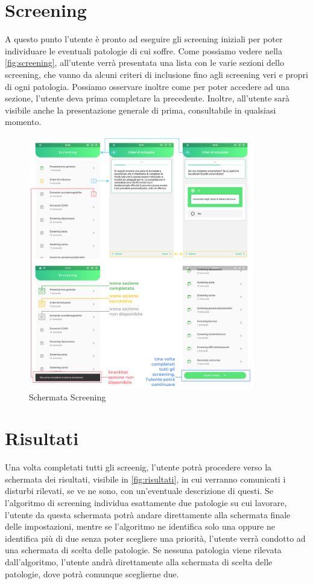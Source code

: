 \newpage
\section{Screening}
\label{section:screening}
A questo punto l'utente è pronto ad eseguire gli screening iniziali per poter individuare le eventuali patologie di cui soffre. Come possiamo vedere nella \autoref{fig:screening}, all'utente verrà presentata una lista con le varie sezioni dello screening, che vanno da alcuni criteri di inclusione fino agli screening veri e propri di ogni patologia. Possiamo osservare inoltre come per poter accedere ad una sezione, l'utente deva prima completare la precedente. Inoltre, all'utente sarà visibile anche la presentazione generale di prima, consultabile in qualsiasi momento.

\begin{figure}[h!]
\centering
\includegraphics[width=0.88\textwidth]{img/screening}
\caption{Schermata Screening}
\label{fig:screening}
\end{figure}

\section{Risultati}
Una volta completati tutti gli screenig, l'utente potrà procedere verso la schermata dei risultati, visibile in \autoref{fig:risultati}, in cui verranno comunicati i disturbi rilevati, se ve ne sono, con un'eventuale descrizione di questi. Se l'algoritmo di screening individua esattamente due patologie su cui lavorare, l'utente da questa schermata potrà andare direttamente alla schermata finale delle impostazioni, mentre se l'algoritmo ne identifica solo una oppure ne identifica più di due senza poter scegliere una priorità, l'utente verrà condotto ad una schermata di scelta delle patologie. Se nessuna patologia viene rilevata dall'algoritmo, l'utente andrà direttamente alla schermata di scelta delle patologie, dove potrà comunque sceglierne due.

